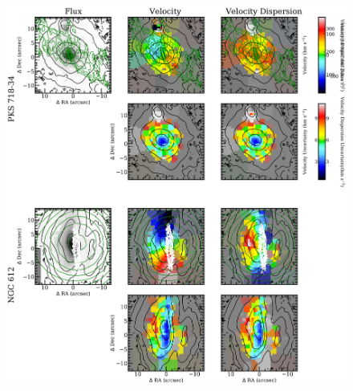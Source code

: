 		\begin{figure}
			\centering
			\includegraphics[height=0.62\textheight]{chapter4/vimos/kin4.png}
		\end{figure}

